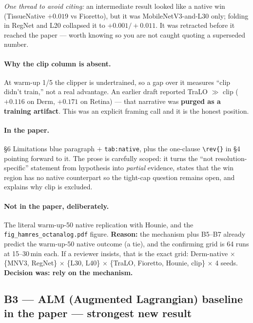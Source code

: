 \documentclass[11pt,a4paper]{article}
\begin{document}
\smallskip
\noindent\emph{One thread to avoid citing:} an intermediate result looked like a native win
(TissueNative $+0.019$ vs Fioretto), but it was MobileNetV3-and-L30 only; folding in RegNet and L20
collapsed it to $+0.001/+0.011$. \textcolor{warnred}{It was retracted before it reached the paper}
--- worth knowing so you are not caught quoting a superseded number.

\paragraph{Why the clip column is absent.} At warm-up 1/5 the clipper is undertrained, so a gap over
it measures ``clip didn't train,'' not a real advantage. An earlier draft reported TraLO
$\gg$ clip ($+0.116$ on Derm, $+0.171$ on Retina) --- that narrative was \textbf{purged as a
training artifact}. This was an explicit framing call and it is the honest position.

\paragraph{In the paper.} \S6 Limitations blue paragraph $+$ \texttt{tab:native}, plus the
one-clause \verb|\rev{}| in \S4 pointing forward to it. The prose is carefully scoped: it turns the
``not resolution-specific'' statement from hypothesis into \emph{partial} evidence, states that the
win region has no native counterpart so the tight-cap question remains open, and explains why clip
is excluded.

\paragraph{Not in the paper, deliberately.} The literal warm-up-50 native replication with Hounie,
and the \texttt{fig\_hamres\_octanalog.pdf} figure. \textbf{Reason:} the mechanism plus B5--B7
already predict the warm-up-50 native outcome (a tie), and the confirming grid is 64 runs at
15--30\,min each. If a reviewer insists, that is the exact grid: Derm-native $\times$ \{MNV3,
RegNet\} $\times$ \{L30, L40\} $\times$ \{TraLO, Fioretto, Hounie, clip\} $\times$ 4 seeds.
\textbf{Decision was: rely on the mechanism.}

\subsection*{B3 --- ALM (Augmented Lagrangian) baseline
\hfill\normalsize\textcolor{okgreen}{\textbf{in the paper --- strongest new result}}}
\end{document}
